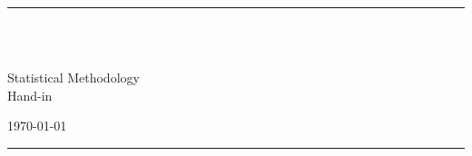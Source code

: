 \fancyhead[C]{}
\hrule \medskip
\begin{minipage}{0.295\textwidth} 
\raggedright
\footnotesize
\yourname \hfill\\
\yournetid \hfill\\
\yourgp
\end{minipage}
\begin{minipage}{0.4\textwidth} 
\centering 
\large
Statistical Methodology\\ 
\large 
Hand-in  \assignmentnumber\\ 
\end{minipage}
\begin{minipage}{0.295\textwidth} 
\raggedleft
\today\hfill\\
\end{minipage}
\medskip\hrule 
\bigskip
